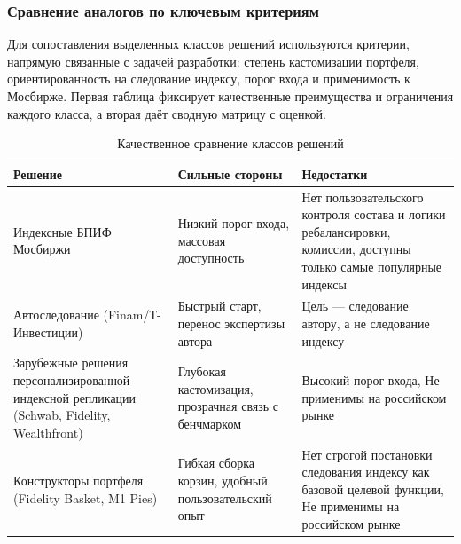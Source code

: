 \documentclass[14pt]{gost-7-32}
\begin{document}
\subsubsection{Сравнение аналогов по ключевым критериям}

Для сопоставления выделенных классов решений используются критерии, напрямую связанные с задачей разработки: степень кастомизации портфеля, ориентированность на следование индексу, порог входа и применимость к Мосбирже. Первая таблица фиксирует качественные преимущества и ограничения каждого класса, а вторая даёт сводную матрицу с оценкой.

\begin{table}[h]
\small
\setlength{\tabcolsep}{4pt}
\begin{tabularx}{\textwidth}{|p{}|>{\raggedright\arraybackslash}X|>{\raggedright\arraybackslash}X|}
\hline
\textbf{Решение} & \textbf{Сильные стороны} & \textbf{Недостатки} \\
\hline
Индексные БПИФ Мосбиржи & Низкий порог входа, массовая доступность & Нет пользовательского контроля состава и логики ребалансировки, комиссии, доступны только самые популярные индексы \\
\hline
Автоследование (Finam/Т-Инвестиции) & Быстрый старт, перенос экспертизы автора & Цель --- следование автору, а не следование индексу \\
\hline
Зарубежные решения персонализированной индексной репликации (Schwab, Fidelity, Wealthfront) & Глубокая кастомизация, прозрачная связь с бенчмарком & Высокий порог входа, Не применимы на российском рынке \\
\hline
Конструкторы портфеля (Fidelity Basket, M1 Pies) & Гибкая сборка корзин, удобный пользовательский опыт & Нет строгой постановки следования индексу как базовой целевой функции, Не применимы на российском рынке\\
\hline
\end{tabularx}
\caption{Качественное сравнение классов решений}
\end{table}
\end{document}
